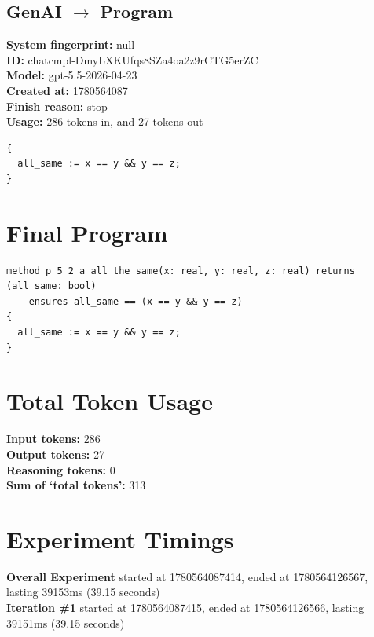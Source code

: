 \documentclass{article}
\begin{document}
\subsection*{GenAI $\rightarrow$ Program}
\textbf{System fingerprint: }null
\\\textbf{ID: }chatcmpl-DmyLXKUfqs8SZa4oa2z9rCTG5erZC
\\\textbf{Model: }gpt-5.5-2026-04-23
\\\textbf{Created at: }1780564087
\\\textbf{Finish reason: }stop
\\\textbf{Usage: }286 tokens in, and 27 tokens out
\begin{lstlisting}
{
  all_same := x == y && y == z;
}
\end{lstlisting}
\section*{Final Program}
\begin{lstlisting}
method p_5_2_a_all_the_same(x: real, y: real, z: real) returns (all_same: bool)
	ensures all_same == (x == y && y == z)
{
  all_same := x == y && y == z;
}
\end{lstlisting}
\section*{Total Token Usage}
\textbf{Input tokens: }286
\\\textbf{Output tokens: }27
\\\textbf{Reasoning tokens: }0
\\\textbf{Sum of `total tokens': }313
\section*{Experiment Timings}
\textbf{Overall Experiment} started at 1780564087414, ended at 1780564126567, lasting 39153ms (39.15 seconds)
\\\textbf{Iteration \#1} started at 1780564087415, ended at 1780564126566, lasting 39151ms (39.15 seconds)
\end{document}
